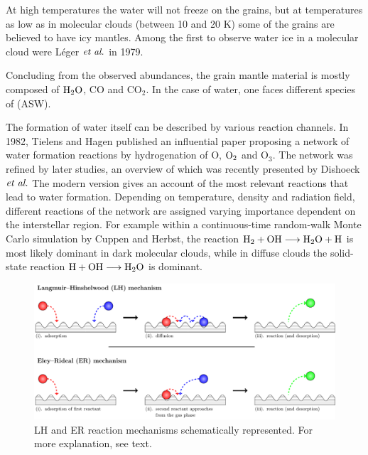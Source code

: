 
At high temperatures the water will not freeze on the grains, but at
temperatures as low as in molecular clouds (between 10 and 20
K)\cite{Ferriere2001} some of the grains are believed to have icy mantles.
Among the first to observe water ice in a molecular cloud were Léger $\emph{et al.}$ in
1979.\cite{Leger1979}

Concluding from the observed abundances, the grain mantle material is mostly
composed of $\text H _2 \text O$, CO and CO$_2$. In the case of water, one faces different
species of  (ASW).\cite{DishoeckHerbstNeufeld2013,JenniskensBlakeWilsonEtAl1995}

The formation of water itself can be described by various reaction channels. In
1982, Tielens and Hagen published an influential paper
proposing a network of water formation reactions by hydrogenation of O, $\text O_2$
and O$_3$.\cite{TielensHagen1982} The network was refined by later studies, an
overview of which was recently presented by Dishoeck $\emph{et al.}$
\cite{DishoeckHerbstNeufeld2013}
The modern version gives an account of the most relevant reactions that lead to
water formation. Depending on temperature, density and radiation field,
different reactions of the network are assigned varying importance dependent on the
interstellar region. For example within a continuous-time random-walk Monte
Carlo simulation by Cuppen and Herbst, the reaction
\mbox{$\text H_2 + \text O \text H \longrightarrow \text H _2 \text O + \text H$} is most likely dominant in dark
molecular clouds, while in diffuse clouds the solid-state reaction \mbox{$\text
H + \text O \text H \longrightarrow \text H _2 \text O$} is dominant. \cite{CuppenHerbst2007}

\begin{figure}[b!]
\includegraphics[width=\textwidth]{TikzPics/TikzCreation/LHAndER/LHAndER.pdf}
\caption{LH and ER reaction mechanisms schematically represented. For
more explanation, see text.}
\label{Int:LHandER}
\end{figure}

